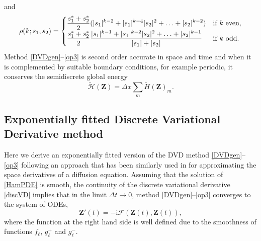 \documentclass[twoside]{article}
\numberwithin{equation}{section}
\begin{document}
and
$$\rho(k;s_1,s_2)=
\begin{cases} 
\displaystyle{
\frac{s_1^*+s_2^*}2(|s_1|^{k-2}+|s_1|^{k-4}|s_2|^2+\ldots+|s_2|^{k-2})} & \text{if\,\,} k \text{\,\,even,}\\
\displaystyle{\frac{s_1^*+s_2^*}2\frac{|s_1|^{k-1}+|s_1|^{k-2}|s_2|^2+\ldots+|s_2|^{k-1}}{|s_1|+|s_2|}} & \text{if\,\,} k \text{\,\,odd.}
\end{cases} 
$$
Method \eqref{DVDgen}--\eqref{op3} is second order accurate in space and time and when it is complemented by suitable boundary conditions, for example periodic, it conserves the semidiscrete global energy \cite{Matsuo}
\begin{equation}\label{SDHam}
\widetilde{\mathcal{H}}(\mathbf{Z})=\Delta x\sum_m \widetilde H(\mathbf{Z})_m.
\end{equation}
\subsection{Exponentially fitted Discrete Variational Derivative method}
Here we derive an exponentially fitted version of the DVD method \eqref{DVDgen}--\eqref{op3} following an approach that has been similarly used in \cite{DP} for approximating the space derivatives of a diffusion equation. Assuming that the solution of \eqref{HamPDE} is smooth, the continuity of the discrete variational derivative \eqref{discVD} implies that in the limit $\Delta t\rightarrow 0$, method \eqref{DVDgen}--\eqref{op3} converges to the system of ODEs,
\begin{equation}\label{ODEsys}
\mathbf{Z}'(t)=-\mathrm i\mathcal{F}(\mathbf{Z}(t),\mathbf{Z}(t)),
\end{equation}
where the function at the right hand side is well defined due to the smoothness of functions $f_\ell$, $g_\ell^+$ and $g_\ell^-$. 
\end{document}
